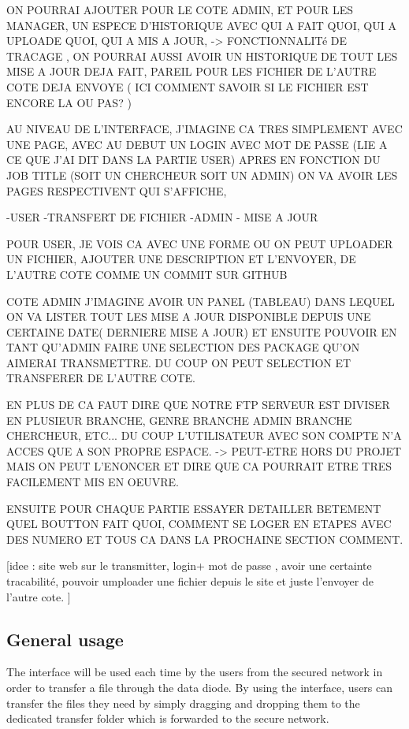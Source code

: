\documentclass[a4paper,10pt]{article}
\begin{document}
ON POURRAI AJOUTER POUR LE COTE ADMIN, ET POUR LES MANAGER, UN ESPECE D'HISTORIQUE AVEC QUI A FAIT QUOI, QUI A UPLOADE QUOI, QUI A MIS A JOUR, -> FONCTIONNALITé DE TRACAGE , ON POURRAI AUSSI AVOIR UN HISTORIQUE DE TOUT LES MISE A JOUR DEJA FAIT, PAREIL POUR LES FICHIER DE L'AUTRE COTE DEJA ENVOYE ( ICI COMMENT SAVOIR SI LE FICHIER EST ENCORE LA OU PAS? )


AU NIVEAU DE L'INTERFACE, J'IMAGINE CA TRES SIMPLEMENT AVEC UNE PAGE, AVEC AU DEBUT UN LOGIN AVEC MOT DE PASSE (LIE A CE QUE J'AI DIT DANS LA PARTIE USER) APRES EN FONCTION DU JOB TITLE (SOIT UN CHERCHEUR SOIT UN ADMIN) ON VA AVOIR LES PAGES RESPECTIVENT QUI S'AFFICHE, 

-USER -TRANSFERT DE FICHIER
-ADMIN - MISE A JOUR

POUR USER, JE VOIS CA AVEC UNE FORME OU ON PEUT UPLOADER UN FICHIER, AJOUTER UNE DESCRIPTION ET L'ENVOYER, DE L'AUTRE COTE COMME UN COMMIT SUR GITHUB

COTE ADMIN J'IMAGINE AVOIR UN PANEL (TABLEAU) DANS LEQUEL ON VA LISTER TOUT LES MISE A JOUR DISPONIBLE DEPUIS UNE CERTAINE DATE( DERNIERE MISE A JOUR) ET ENSUITE POUVOIR EN TANT QU'ADMIN FAIRE UNE SELECTION DES PACKAGE QU'ON AIMERAI TRANSMETTRE. DU COUP ON PEUT SELECTION ET TRANSFERER DE L'AUTRE COTE.

EN PLUS DE CA FAUT DIRE QUE NOTRE FTP SERVEUR EST DIVISER EN PLUSIEUR BRANCHE, GENRE BRANCHE ADMIN BRANCHE CHERCHEUR, ETC... DU COUP L'UTILISATEUR AVEC SON COMPTE N'A ACCES QUE A SON PROPRE ESPACE. -> PEUT-ETRE HORS DU PROJET MAIS ON PEUT L'ENONCER ET DIRE QUE CA POURRAIT ETRE TRES FACILEMENT MIS EN OEUVRE.

ENSUITE POUR CHAQUE PARTIE ESSAYER DETAILLER BETEMENT QUEL BOUTTON FAIT QUOI, COMMENT SE LOGER EN ETAPES AVEC DES NUMERO ET TOUS CA DANS LA PROCHAINE SECTION COMMENT.


[idee : site web sur le transmitter, login+ mot de passe , avoir une certainte tracabilité, pouvoir umploader une fichier depuis le site et juste l'envoyer de l'autre cote. ]\\


\subsection{General usage}
The interface will be used each time by the users from the secured network
in order to transfer a file through the data diode. By using the interface,
users can transfer the files they need by simply dragging and dropping them to
the dedicated transfer folder which is forwarded to the secure network.
\end{document}
